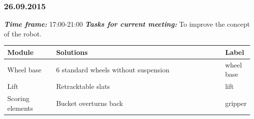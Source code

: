 \subsubsection{26.09.2015}
	\textit{\textbf{Time frame:}} 17:00-21:00 \newline \newline
	\textit{\textbf{Tasks for current meeting:}} To improve the concept of the robot.

  \begin{table}[H]
	\vspace{-2mm}
	\begin{center}
		\begin{tabular}{|p{0.2\linewidth}|p{0.7\linewidth}|p{0.1\linewidth}|}
			\hline
			Module & Solutions & Label \\
			\hline
			Wheel base & 6 standard wheels without suspension & wheel base \\
			\hline
			Lift & Retracktable slats & lift \\
			\hline
			Scoring elements & Bucket overturns back & gripper \\
		\end{tabular}
	\end{center}
  \end{table}
  
